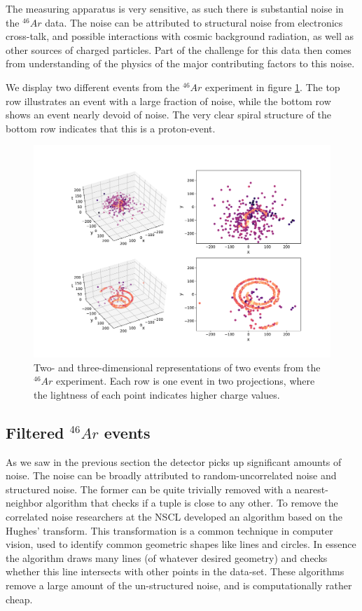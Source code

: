 The measuring apparatus is very sensitive, as such there is substantial noise in the ${}^{46}Ar$ data. The noise can be attributed to structural noise from electronics cross-talk, and possible interactions with cosmic background radiation, as well as other sources of charged particles. Part of the challenge for this data then comes from understanding of the physics of the major contributing factors to this noise. 

We display two different events from the ${}^{46}Ar$ experiment in figure \ref{fig:samples}. The top row illustrates an event with a large fraction of noise, while the bottom row shows an event nearly devoid of noise. The very clear spiral structure of the bottom row indicates that this is a proton-event.

\begin{figure}[H]
\centering
\includegraphics[width=\textwidth]{../plots/display_eventsfull_.pdf}
\caption[Displaying un-filtered events in 2D and 3D]{Two- and three-dimensional representations of two events from the ${}^{46}Ar$ experiment. Each row is one event in two projections, where the lightness of each point indicates higher charge values.}\label{fig:samples}
\end{figure}

\subsection{Filtered \texorpdfstring{${}^{46}Ar$}{46Ar} events}\label{sec:filtered}

As we saw in the previous section the detector picks up significant amounts of noise. The noise can be broadly attributed to random-uncorrelated noise and structured noise. The former can be quite trivially removed with a nearest-neighbor algorithm that checks if a tuple is close to any other. To remove the correlated noise researchers at the NSCL developed an algorithm based on the Hughes' transform. This transformation is a common technique in computer vision, used to identify common geometric shapes like lines and circles. In essence the algorithm draws many lines (of whatever desired geometry) and checks whether this line intersects with other points in the data-set. These algorithms remove a large amount of the un-structured noise, and is computationally rather cheap.

